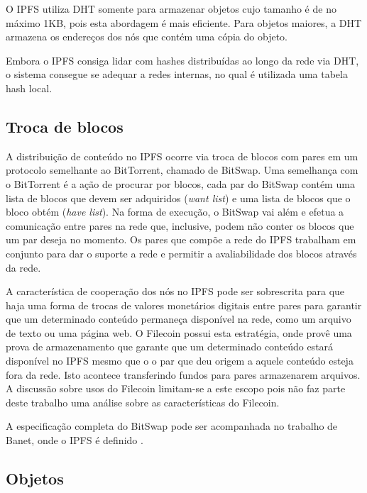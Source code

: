 \documentclass[tcc,capa]{texufpel}
\begin{document}
        O IPFS utiliza DHT somente para armazenar objetos cujo tamanho é de no máximo 1KB, pois esta abordagem é mais eficiente. Para objetos maiores, a DHT armazena os endereços dos nós que contém uma cópia do objeto.
        
        Embora o IPFS consiga lidar com hashes distribuídas ao longo da rede via DHT, o sistema consegue se adequar a redes internas, no qual é utilizada uma tabela hash local.
        
        \subsection{Troca de blocos}
        
        A distribuição de conteúdo no IPFS ocorre via troca de blocos com pares em um protocolo semelhante ao BitTorrent, chamado de BitSwap. Uma semelhança com o BitTorrent é a ação de procurar por blocos, cada par do BitSwap contém uma lista de blocos que devem ser adquiridos (\textit{want list}) e uma lista de blocos que o bloco obtém (\textit{have list}). Na forma de execução, o BitSwap vai além e efetua a comunicação entre pares na rede que, inclusive, podem não conter os blocos que um par deseja no momento. Os pares que compõe a rede do IPFS trabalham em conjunto para dar o suporte a rede e permitir a avaliabilidade dos blocos através da rede.
        
        A característica de cooperação dos nós no IPFS pode ser sobrescrita para que haja uma forma de trocas de valores monetários digitais entre pares para garantir que um determinado conteúdo permaneça disponível na rede, como um arquivo de texto ou uma página web. O Filecoin possui esta estratégia, onde provê uma prova de armazenamento que garante que um determinado conteúdo estará disponível no IPFS mesmo que o o par que deu origem a aquele conteúdo esteja fora da rede. Isto acontece transferindo fundos para pares armazenarem arquivos. A discussão sobre usos do Filecoin limitam-se a este escopo pois não faz parte deste trabalho uma análise sobre as características do Filecoin.
        
        A especificação completa do BitSwap pode ser acompanhada no trabalho de Banet, onde o IPFS é definido \cite{benet2014ipfs}.
        
        \subsection{Objetos}
        
\end{document}
